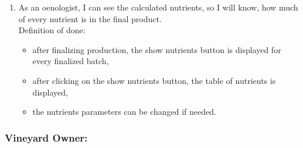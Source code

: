 \begin{enumerate}
\begin{itemize}
	\end{itemize}
	\item As an oenologist, I can see the calculated nutrients, so I will know, how much of every nutrient is in the final product.
	\\Definition of done:
	\begin{itemize}
		\item after finalizing production, the show nutrients button is displayed for every finalized batch,
		\item after clicking on the show nutrients button, the table of nutrients is displayed,
		\item the nutrients parameters can be changed if needed.
	\end{itemize}
\end{enumerate}

\subsubsection{Vineyard Owner:}

